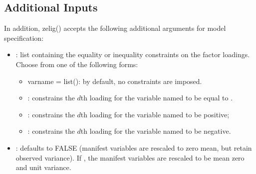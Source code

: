 \documentclass[letterpaper,10pt,english]{sphinxmanual}
\begin{document}
\subsection{Additional Inputs}
\label{vignette:additional-inputs}
In addition, zelig() accepts the following additional arguments for
model specification:
\begin{itemize}
\item {} 
: list containing the equality or inequality
constraints on the factor loadings. Choose from one of the following
forms:
\begin{itemize}
\item {} 
varname = list(): by default, no constraints are imposed.

\item {} 
: constrains the \(d\)th loading for
the variable named  to be equal to .

\item {} 
: constrains the \(d\)th loading for
the variable named  to be positive;

\item {} 
: constrains the \(d\)th loading for
the variable named  to be negative.

\end{itemize}

\item {} 
: defaults to FALSE (manifest variables are rescaled to
zero mean, but retain observed variance). If , the manifest
variables are rescaled to be mean zero and unit variance.

\end{itemize}
\end{document}
